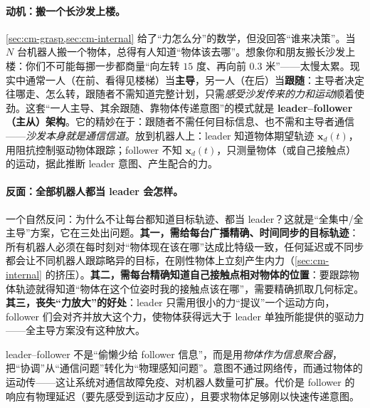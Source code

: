 \paragraph{动机：搬一个长沙发上楼。}
\cref{sec:cm-grasp,sec:cm-internal} 给了“力怎么分”的数学，但没回答“谁来决策”。当 $N$ 台机器人搬一个物体，总得有人知道“物体该去哪”。想象你和朋友搬长沙发上楼：你们不可能每挪一步都商量“向左转 $15$ 度、再向前 $0.3$ 米”——太慢太累。现实中通常一人（在前、看得见楼梯）当\textbf{主导}，另一人（在后）当\textbf{跟随}：主导者决定往哪走、怎么转，跟随者不需知道完整计划，只需\emph{感受沙发传来的力和运动}顺着使劲。这套“一人主导、其余跟随、靠物体传递意图”的模式就是 \textbf{leader--follower（主从）架构}。它的精妙在于：跟随者不需任何目标信息、也不需和主导者通信——\emph{沙发本身就是通信信道}。放到机器人上：leader 知道物体期望轨迹 $\mathbf{x}_d(t)$，用阻抗控制驱动物体跟踪；follower 不知 $\mathbf{x}_d(t)$，只测量物体（或自己接触点）的运动，据此推断 leader 意图、产生配合的力。

\paragraph{反面：全部机器人都当 leader 会怎样。}
一个自然反问：为什么不让每台都知道目标轨迹、都当 leader？这就是“全集中/全主导”方案，它在三处出问题。\textbf{其一，需给每台广播精确、时间同步的目标轨迹}：所有机器人必须在每时刻对“物体现在该在哪”达成比特级一致，任何延迟或不同步都会让不同机器人跟踪略异的目标，在刚性物体上立刻产生内力（\cref{sec:cm-internal} 的挤压）。\textbf{其二，需每台精确知道自己接触点相对物体的位置}：要跟踪物体轨迹就得知道“物体在这个位姿时我的接触点该在哪”，需要精确抓取几何标定。\textbf{其三，丧失“力放大”的好处}：leader 只需用很小的力“提议”一个运动方向，follower 们会对齐并放大这个力，使物体获得远大于 leader 单独所能提供的驱动力——全主导方案没有这种放大。

\begin{insight}
leader--follower 不是“偷懒少给 follower 信息”，而是用\emph{物体作为信息聚合器}，把“协调”从“通信问题”转化为“物理感知问题”。意图不通过网络传，而通过物体的运动传——这让系统对通信故障免疫、对机器人数量可扩展。代价是 follower 的响应有物理延迟（要先感受到运动才反应），且要求物体足够刚以快速传递意图。
\end{insight}

